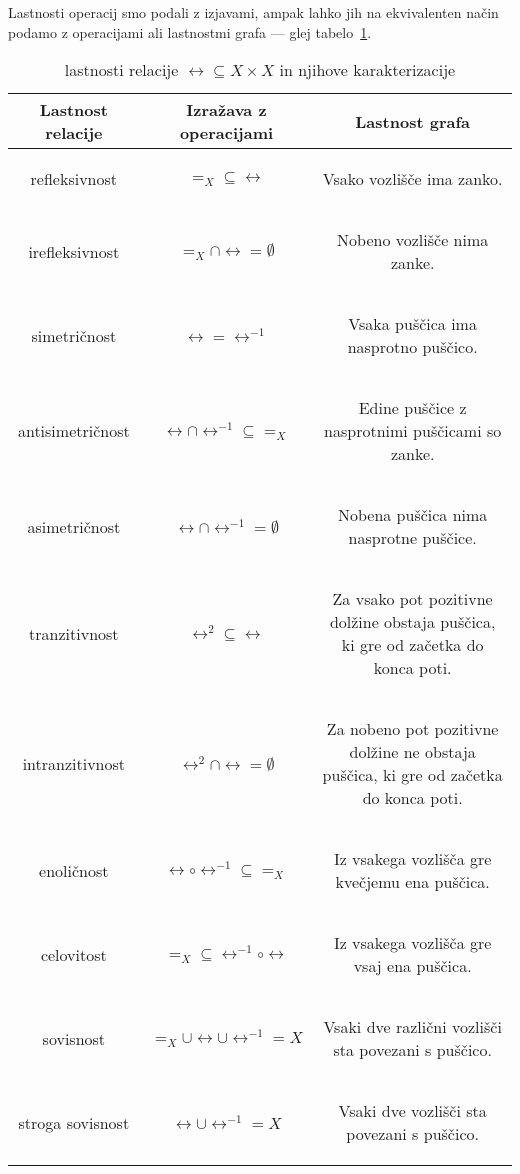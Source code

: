 		Lastnosti operacij smo podali z izjavami, ampak lahko jih na ekvivalenten način podamo z operacijami ali lastnostmi grafa --- glej tabelo~\ref{TABELA: lastnosti relacije}.
		
		
		\begin{table}[!ht]
			\centering
			\newcommand{\opis}[1]{\begin{minipage}{0.45\textwidth}\begin{center}{#1}\end{center}\end{minipage}}
			\def\arraystretch{3}
			\begin{tabular}{|ccc|}
				\hline
				\textbf{Lastnost relacije} & \textbf{Izražava z operacijami} & \textbf{Lastnost grafa} \\
				\hline
				refleksivnost & $=_X \subseteq \rel$ & \opis{Vsako vozlišče ima zanko.} \\
				irefleksivnost & $=_X \cap \rel = \emptyset$ & \opis{Nobeno vozlišče nima zanke.} \\
				simetričnost & $\rel = \rel^{-1}$ & \opis{Vsaka puščica ima nasprotno puščico.} \\
				antisimetričnost & $\rel \cap \rel^{-1} \subseteq =_X$ & \opis{Edine puščice z nasprotnimi puščicami so zanke.} \\
				asimetričnost & $\rel \cap \rel^{-1} = \emptyset$ & \opis{Nobena puščica nima nasprotne puščice.} \\
				tranzitivnost & $\rel^2 \subseteq \rel$ & \opis{Za vsako pot pozitivne dolžine obstaja puščica, ki gre od začetka do konca poti.} \\
				intranzitivnost & $\rel^2 \cap \rel = \emptyset$ & \opis{Za nobeno pot pozitivne dolžine ne obstaja puščica, ki gre od začetka do konca poti.} \\
				enoličnost & $\rel \circ \rel^{-1} \subseteq =_X$ & \opis{Iz vsakega vozlišča gre kvečjemu ena puščica.} \\
				celovitost & $=_X \subseteq \rel^{-1} \circ \rel$ & \opis{Iz vsakega vozlišča gre vsaj ena puščica.} \\
				sovisnost & $=_X \cup \rel \cup \rel^{-1} = X$ & \opis{Vsaki dve različni vozlišči sta povezani s puščico.} \\
				stroga sovisnost & $\rel \cup \rel^{-1} = X$ & \opis{Vsaki dve vozlišči sta povezani s puščico.} \\
				\hline
			\end{tabular}
			\caption{lastnosti relacije $\rel \subseteq X \times X$ in njihove karakterizacije}\label{TABELA: lastnosti relacije}
		\end{table}
		
